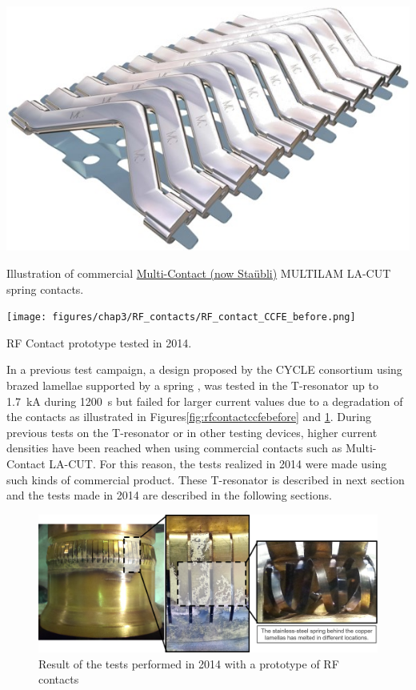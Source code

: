 {\begin{marginfigure}[-9cm]
	\centering
	\includegraphics[width=0.9\linewidth]{figures/chap3/RF_contacts/RF_contact_LACUT}
	\caption{Illustration of commercial \href{https://ec.staubli.com/products/productline/7}{Multi-Contact (now Staübli)} MULTILAM  LA-CUT spring contacts. }
	\label{fig:rfcontactlacut}
\end{marginfigure}

\begin{marginfigure}[-2cm]
	\centering
	\texttt{[image: figures/chap3/RF\_contacts/RF\_contact\_CCFE\_before.png]}
	\caption{RF Contact prototype tested in 2014.}
	\label{fig:rfcontactccfebefore}
\end{marginfigure}

In a previous test campaign, a design proposed by the CYCLE consortium using brazed lamellae supported by a spring \cite{argouarch2014}, was tested in the T-resonator up to 1.7~kA during 1200~s but failed for larger current values due to a degradation of the contacts as illustrated in Figures\ref{fig:rfcontactccfebefore} and \ref{fig:rfcontactccfe}\cite{hillairet2015-1}. During previous tests on the T-resonator or in other testing devices, higher current densities have been reached when using commercial contacts such as Multi-Contact LA-CUT\cite{argouarch2013}. For this reason, the tests realized in 2014 were made using such kinds of commercial product. These T-resonator is described in next section and the tests made in 2014 are described in the following sections.

\begin{figure}[h]
	\centering
	\includegraphics[width=1.0\linewidth]{figures/chap3/RF_contacts/RF_contact_CCFE}
	\caption{Result of the tests performed in 2014 with a prototype of RF contacts}
	\label{fig:rfcontactccfe}
\end{figure}

}
